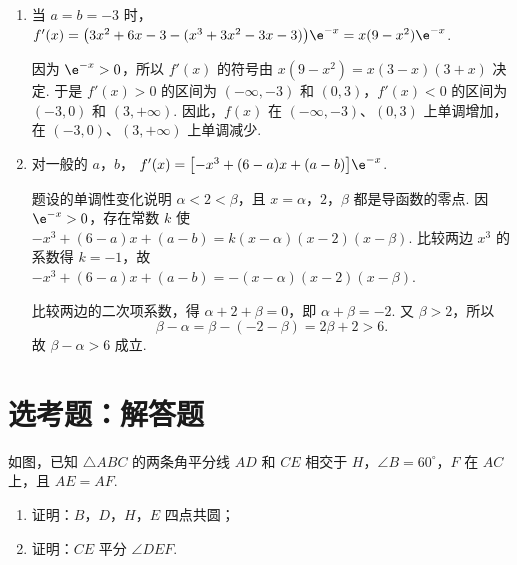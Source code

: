 \begin{solution}
\begin{enumerate}
\item 当 \(a=b=-3\) 时，
\(f'(x)=\bigl(3x^2+6x-3-(x^3+3x^2-3x-3)\bigr)\e^{-x}=x(9-x^2)\e^{-x}\).

因为 \(\e^{-x}>0\)，所以 \(f'(x)\) 的符号由 \(x(9-x^2)=x(3-x)(3+x)\) 决定. 于是 \(f'(x)>0\) 的区间为 \((-\infty,-3)\) 和 \((0,3)\)，\(f'(x)<0\) 的区间为 \((-3,0)\) 和 \((3,+\infty)\). 因此，\(f(x)\) 在 \((-\infty,-3)\)、\((0,3)\) 上单调增加，在 \((-3,0)\)、\((3,+\infty)\) 上单调减少.
\item 对一般的 \(a\)，\(b\)，
\(f'(x)=\bigl[-x^3+(6-a)x+(a-b)\bigr]\e^{-x}\).

题设的单调性变化说明 \(\alpha<2<\beta\)，且 \(x=\alpha\)，\(2\)，\(\beta\) 都是导函数的零点. 因 \(\e^{-x}>0\)，存在常数 \(k\) 使
\(-x^3+(6-a)x+(a-b)=k(x-\alpha)(x-2)(x-\beta)\).
比较两边 \(x^3\) 的系数得 \(k=-1\)，故
\(-x^3+(6-a)x+(a-b)=-(x-\alpha)(x-2)(x-\beta)\).

比较两边的二次项系数，得 \(\alpha+2+\beta=0\)，即 \(\alpha+\beta=-2\). 又 \(\beta>2\)，所以
\[
\beta-\alpha=\beta-(-2-\beta)=2\beta+2>6.
\]
故 \(\beta-\alpha>6\) 成立.
\end{enumerate}
\end{solution}

\section{选考题：解答题}

\begin{problem}
如图，已知 \(\triangle ABC\) 的两条角平分线 \(AD\) 和 \(CE\) 相交于 \(H\)，\(\angle B = 60^{\circ}\)，\(F\) 在 \(AC\) 上，且 \(AE = AF\).

\begin{enumerate}
\item 证明：\(B\)，\(D\)，\(H\)，\(E\) 四点共圆；
\item 证明：\(CE\) 平分 \(\angle DEF\).
\end{enumerate}

\end{problem}


